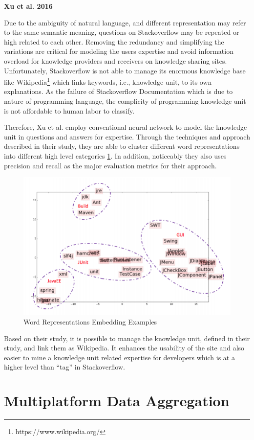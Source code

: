 \textbf{Xu et al. 2016}

Due to the ambiguity of natural language, and different representation may refer to the same semantic meaning, questions on Stackoverflow may be repeated or high related to each other. Removing the redundancy and simplifying the variations are critical for modeling the users expertise and avoid information overload for knowledge providers and receivers on knowledge sharing sites. Unfortunately, Stackoverflow is not able to manage its enormous knowledge base like Wikipedia\footnote{https://www.wikipedia.org/} which links keywords, i.e., knowledge unit, to its own explanations. As the failure of Stackoverflow Documentation which is due to nature of programming language, the complicity of programming knowledge unit is not affordable to human labor to classify.

Therefore, Xu et al. employ conventional neural network to model the knowledge unit in questions and answers for expertise. Through the techniques and approach described in their study, they are able to cluster different word representations into different high level categories \ref{knowledgeUnit}. In addition, noticeably they also uses precision and recall as the major evaluation metrics for their approach.

\begin{figure}
\includegraphics[width = 0.5\columnwidth]{KnowledgeUnit.png}
\centering
\caption{Word Representations Embedding Examples \cite{xu2016predicting}}
\label{knowledgeUnit}
\end{figure}

Based on their study, it is possible to manage the knowledge unit, defined in their study, and link them as Wikipedia. It enhances the usability of the site and also easier to mine a knowledge unit related expertise for developers which is at a higher level than ``tag'' in Stackoverflow.

\section{Multiplatform Data Aggregation}

